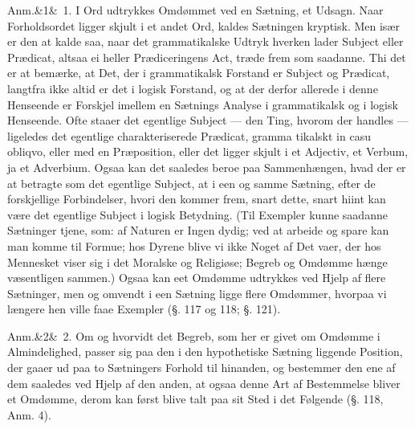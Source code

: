 \documentclass[12pt]{book}
\def\sperr#1{#1}%
\def\textit#1{#1}%
\def\emph#1{#1}%
\newcommand{\sperr}[1]{\textls[180]{#1}}
\newcommand{\anm}[1]{%
  \par\vspace{0.5\baselineskip}%
  \noindent\hspace{\parindent}\sperr{Anm.}\ifx&#1&\else~\textit{#1}.\fi
  \enspace\ignorespaces
}
\newcommand{\opage}[1]{\marginnote{\footnotesize\textit{[#1]}}}
\begin{document}
\anm{1} I Ord udtrykkes Omdømmet ved en \emph{Sætning}, et \emph{Udsagn}. Naar
Forholdsordet ligger skjult i et andet Ord, kaldes Sætningen \emph{kryptisk}. Men især
er den at kalde saa, naar det grammatikalske Udtryk hverken lader \emph{Subject} eller
\emph{Prædicat}, altsaa ei heller \emph{Prædiceringens Act}, træde frem som saadanne.
Thi det er at bemærke, at Det, der i grammatikalsk Forstand er \emph{Subject} og
\emph{Prædicat}, langtfra ikke altid er det i logisk Forstand, og at der derfor allerede
i denne Henseende er Forskjel imellem en Sætnings \emph{Analyse} i grammatikalsk og i
logisk Henseende. Ofte staaer det egentlige \emph{Subject} --- den Ting, hvorom der
handles --- ligeledes det egentlige charakteriserede \emph{Prædicat}, gramma%
\opage{251}tikalskt \textit{in casu obliqvo}, eller med en \emph{Præposition}, eller det ligger
skjult i et \emph{Adjectiv}, et \emph{Verbum}, ja et \emph{Adverbium}. Ogsaa kan det
saaledes beroe paa Sammenhængen, hvad der er at betragte som det egentlige
\emph{Subject}, at i een og samme Sætning, efter de forskjellige Forbindelser, hvori den
kommer frem, snart dette, snart hiint kan være det egentlige \emph{Subject} i logisk
Betydning. (Til Exempler kunne saadanne Sætninger tjene, som: af Naturen er Ingen
dydig; ved at arbeide og spare kan man komme til Formue; hos Dyrene blive vi ikke Noget
af Det vaer, der hos Mennesket viser sig i det Moralske og Religiøse; Begreb og Omdømme
hænge væsentligen sammen.) Ogsaa kan eet Omdømme udtrykkes ved Hjelp af flere
Sætninger, men og omvendt i een Sætning ligge flere Omdømmer, hvorpaa vi længere hen
ville faae Exempler (§. 117 og 118; §. 121).

\anm{2} Om og hvorvidt det Begreb, som her er givet om Omdømme i Almindelighed, passer
sig paa den i den hypothetiske Sætning liggende \emph{Position}, der gaaer ud paa to
Sætningers Forhold til hinanden, og bestemmer den ene af dem saaledes ved Hjelp af den
anden, at ogsaa denne Art af Bestemmelse bliver et Omdømme, derom kan først blive talt
paa sit Sted i det Følgende (§. 118, Anm. 4).
\end{document}
